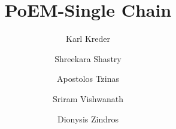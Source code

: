 \title{PoEM-Single Chain}
\ifanonymous{\iflncs
\author{}\institute{}
\fi}
\else
\author{
        Karl Kreder \and
        Shreekara Shastry \and
        Apostolos Tzinas \and
        Sriram Vishwanath \and %
        Dionysis Zindros
}
